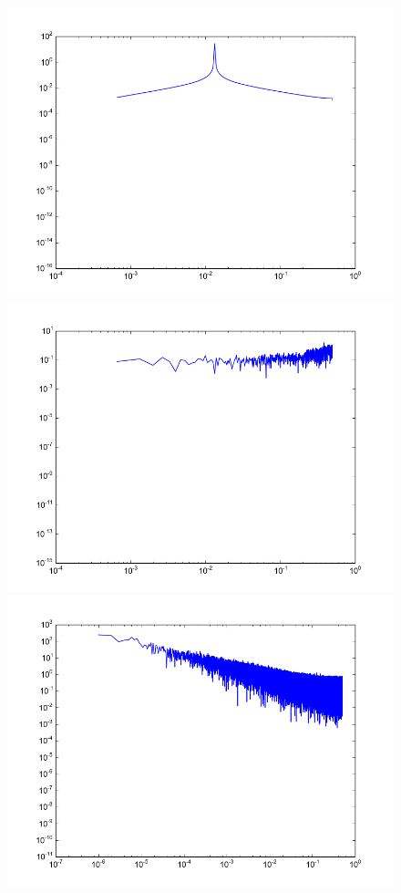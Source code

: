 \documentclass[12pt]{article}
\begin{document}
\begin{figure}\label{fig:stack_ts_spectra}
  \begin{center}
    \includegraphics[scale=0.4]{spectrum_sinusoid}
    \includegraphics[scale=0.4]{spectrum_logistic}
    \includegraphics[scale=0.4]{spectrum_fbm}

\end{center}
\end{figure}
\end{document}
